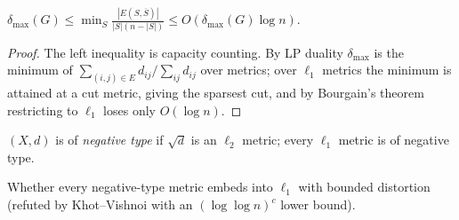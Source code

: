 \begin{theorem}
  \label{thm:leighton-rao}
  $\delta_{\max}(G)\le\min_S\frac{|E(S,\overline S)|}{|S|(n-|S|)}\le
  O(\delta_{\max}(G)\log n)$.
\end{theorem}
\begin{proof}
  The left inequality is capacity counting. By LP duality $\delta_{\max}$ is the
  minimum of $\sum_{(i,j)\in E}d_{ij}/\sum_{ij}d_{ij}$ over metrics; over
  $\ell_1$ metrics the minimum is attained at a cut metric, giving the sparsest
  cut, and by Bourgain's theorem restricting to $\ell_1$ loses only $O(\log n)$.
\end{proof}

\begin{definition}
  \label{def:negative-type}
  $(X,d)$ is of \emph{negative type} if $\sqrt d$ is an $\ell_2$ metric; every
  $\ell_1$ metric is of negative type.
\end{definition}

\begin{theorem}
  \label{conj:negative-type-l1}
  \notready
  Whether every negative-type metric embeds into $\ell_1$ with bounded
  distortion (refuted by Khot--Vishnoi with an $(\log\log n)^c$ lower bound).
\end{theorem}
